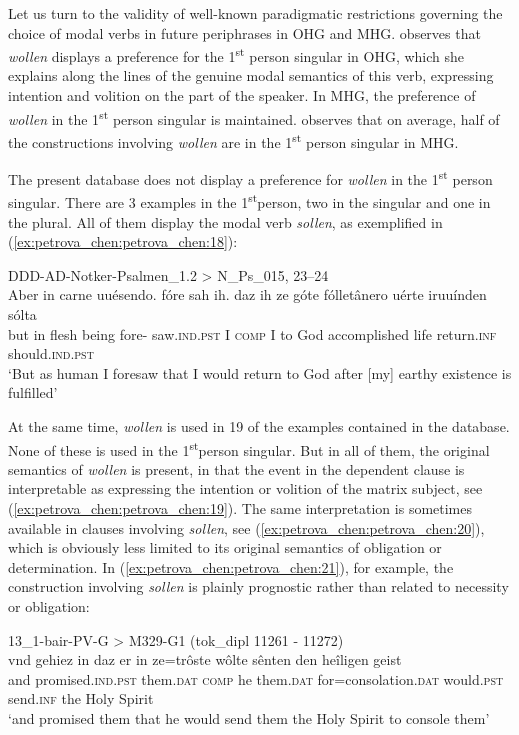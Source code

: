 \documentclass[output=paper,colorlinks,citecolor=brown]{langscibook}
\begin{document}
\largerpage[1]

Let us turn to the validity of well-known paradigmatic restrictions governing the choice of modal verbs in future periphrases in OHG and MHG. \citet[37]{Hinsdale1897} observes that \textit{wollen} displays a preference for the 1\textsuperscript{st} person singular in OHG, which she explains along the lines of the genuine modal semantics of this verb, expressing intention and volition on the part of the speaker. In MHG, the preference of \textit{wollen} in the 1\textsuperscript{st} person singular is maintained. \citet[94–95]{Luther2013} observes that on average, half of the constructions involving \textit{wollen} are in the 1\textsuperscript{st} person singular in MHG.

The present database does not display a preference for \textit{wollen} in the 1\textsuperscript{st} person singular. There are 3 examples in the 1\textsuperscript{st}person, two in the singular and one in the plural. All of them display the modal verb \textit{sollen}, as exemplified in (\ref{ex:petrova_chen:petrova_chen:18}):

\ea \label{ex:petrova_chen:petrova_chen:18} DDD-AD-Notker-Psalmen\_1.2 > N\_Ps\_015, 23–24\\
\gll Aber in carne uuésendo. fóre sah ih. daz ih ze góte fólletânero uérte iruuínden sólta\\
but in flesh being fore- saw.\textsc{ind.pst} I \textsc{comp} I to God accomplished life return.\textsc{inf} should.\textsc{ind.pst}\\
\glt ‘But as human I foresaw that I would return to God after [my] earthy existence is fulfilled’
\z

At the same time, \textit{wollen} is used in 19 of the examples contained in the database. None of these is used in the 1\textsuperscript{st}person singular. But in all of them, the original semantics of\textit{ wollen} is present, in that the event in the dependent clause is interpretable as expressing the intention or volition of the matrix subject, see (\ref{ex:petrova_chen:petrova_chen:19}). The same interpretation is sometimes available in clauses involving \textit{sollen}, see (\ref{ex:petrova_chen:petrova_chen:20}), which is obviously less limited to its original semantics of obligation or determination. In (\ref{ex:petrova_chen:petrova_chen:21}), for example, the construction involving \textit{sollen} is plainly prognostic rather than related to necessity or obligation:

\ea \label{ex:petrova_chen:petrova_chen:19} 13\_1-bair-PV-G > M329-G1 (tok\_dipl 11261 - 11272)\\
\gll vnd gehiez in daz er in ze=trôste wôlte sênten den heîligen geist\\
and promised.\textsc{ind.pst} them.\textsc{dat} \textsc{comp} he them.\textsc{dat} for=consolation.\textsc{dat} would.\textsc{pst} send.\textsc{inf} the Holy Spirit\\
\glt ‘and promised them that he would send them the Holy Spirit to console them’
\z
\end{document}
